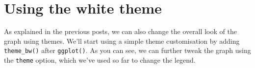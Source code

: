 \section{Using the white theme}\label{using-the-white-theme-2}

As explained in the previous posts, we can also change the overall look
of the graph using themes. We'll start using a simple theme
customisation by adding \texttt{theme\_bw()} after \texttt{ggplot()}. As
you can see, we can further tweak the graph using the \texttt{theme}
option, which we've used so far to change the legend.

\begin{Shaded}
\begin{Highlighting}[]
\StringTok{ }\NormalTok{() +}
\StringTok{      }\NormalTok{(}\NormalTok{(}    
\StringTok{        }\NormalTok{) +}\StringTok{ }
\StringTok{      }\NormalTok{(}\NormalTok{(}   
\StringTok{        }\NormalTok{), } \StringTok{ }
\StringTok{      }\NormalTok{(}\NormalTok{(}\NormalTok{,}\NormalTok{,}\NormalTok{)) +}\StringTok{ }
\StringTok{      }\NormalTok{(}\NormalTok{, }\NormalTok{) +}\StringTok{ }
\StringTok{      }\NormalTok{(}\NormalTok{) +}\StringTok{ }
\StringTok{      }\NormalTok{(}
\StringTok{      }\NormalTok{() +}
\StringTok{      }\NormalTok{(}\NormalTok{, }
        \NormalTok{, }
         \NormalTok{())   }
\end{Highlighting}
\end{Shaded}

